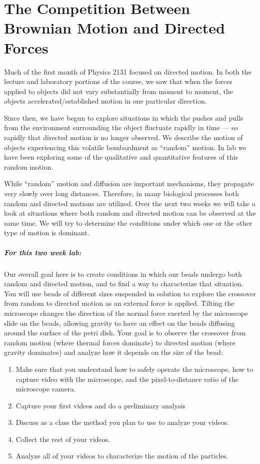\chapter{The Competition Between Brownian Motion and Directed Forces}
\thispagestyle{fancy}

Much of the first month of Physics 2131 focused on directed motion.
In both the lecture and laboratory portions of the course, we saw that when the forces applied to objects did not vary substantially from moment to moment, the objects accelerated/established motion in one particular direction.
\par
Since then, we have begun to explore situations in which the pushes and pulls from the environment surrounding the object fluctuate rapidly in time — so rapidly that directed motion is no longer observed. 
We describe the motion of objects experiencing this volatile bombardment as ``random'' motion. 
In lab we have been exploring some of the qualitative and quantitative features of this random motion.
\par
While ``random'' motion and diffusion are important mechanisms, they propagate very slowly over long distances. 
Therefore, in many biological processes both random and directed motions are utilized. 
Over the next two weeks we will take a look at situations where both random and directed motion can be observed at the same time. 
We will try to determine the conditions under which one or the other type of motion is dominant.

\paragraph{For this two week lab:} Our overall goal here is to create conditions in which our beads undergo both random and directed motion, and to find a way to characterize that situation. 
You will use beads of different sizes suspended in solution to explore the crossover from random to directed motion as an external force is applied.
Tilting the microscope changes the direction of the normal force exerted by the microscope slide on the beads, allowing gravity to have an effect on the beads diffusing around the surface of the petri dish.
Your goal is to observe the crossover from random motion (where thermal forces dominate) to directed motion (where gravity dominates) and analyze how it depends on the size of the bead:
\begin{enumerate}
\item Make sure that you understand how to safely operate the microscope, how to capture video with the microscope, and the pixel-to-distance ratio of the microscope camera.
\item Capture your first videos and do a preliminary analysis
\item Discuss as a class the method you plan to use to analyze your videos.
\item Collect the rest of your videos.
\item Analyze all of your videos to characterize the motion of the particles.
\end{enumerate}

